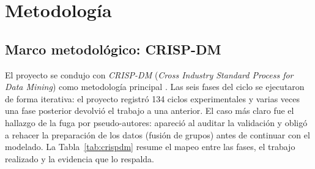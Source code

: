 \section{Metodología}
\label{sec:metodologia}

\subsection{Marco metodológico: CRISP-DM}
\label{subsec:crispdm}

El proyecto se condujo con \emph{CRISP-DM} (\emph{Cross Industry Standard
Process for Data Mining}) como metodología principal \cite{wirth2000crisp}.
Las seis fases del ciclo se ejecutaron de forma iterativa: el proyecto
registró 134 ciclos experimentales y varias veces una fase posterior devolvió
el trabajo a una anterior. El caso más claro fue el hallazgo de la fuga por
pseudo-autores: apareció al auditar la validación y obligó a rehacer la
preparación de los datos (fusión de grupos) antes de continuar con el
modelado. La Tabla~\ref{tab:crispdm} resume el mapeo entre las fases, el
trabajo realizado y la evidencia que lo respalda.

